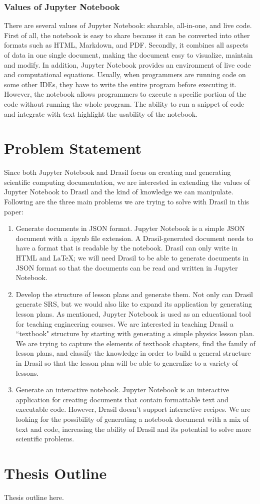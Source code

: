 \subsubsection{Values of Jupyter Notebook}
There are several values of Jupyter Notebook: sharable, all-in-one, and live 
code. First of all, the notebook is easy to share because it can be converted 
into other formats such as HTML, Markdown, and PDF. Secondly, it combines all 
aspects of data in one single document, making the document easy to visualize, 
maintain and modify. In addition, Jupyter Notebook provides an environment of 
live code and computational equations. Usually, when programmers are running 
code on some other IDEs, they have to write the entire program before executing 
it. However, the notebook allows programmers to execute a specific portion of 
the code without running the whole program. The ability to run a snippet of 
code and integrate with text highlight the usability of the notebook.

\section{Problem Statement}
Since both Jupyter Notebook and Drasil focus on creating and generating 
scientific computing documentation, we are interested in extending the values 
of Jupyter Notebook to Drasil and the kind of knowledge we can manipulate. 
Following are the three main problems we are trying to solve with Drasil in 
this paper:

\begin{enumerate}
	\item Generate documents in JSON format. Jupyter Notebook is a simple JSON 
	document with a .ipynb file extension. A Drasil-generated document needs to 
	have a format that is readable by the notebook. Drasil can only write in 
	HTML and LaTeX; we will need Drasil to be able to generate documents in 
	JSON format so that the documents can be read and written in Jupyter 
	Notebook.
	\item Develop the structure of lesson plans and generate them. Not only can 
	Drasil generate SRS, but we would also like to expand its application by 
	generating lesson plans. As mentioned, Jupyter Notebook is used as an 
	educational tool for teaching engineering courses. We are interested in 
	teaching Drasil a ``textbook" structure by starting with generating a 
	simple physics lesson plan. We are trying to capture the elements of 
	textbook chapters, find the family of lesson plans, and classify the 
	knowledge in order to build a general structure in Drasil so that the 
	lesson plan will be able to generalize to a variety of lessons.
	\item Generate an interactive notebook. Jupyter Notebook is an interactive 
	application for creating documents that contain formattable text and 
	executable code. However, Drasil doesn't support interactive recipes. We 
	are looking for the possibility of generating a notebook document with a 
	mix of text and code, increasing the ability of Drasil and its potential to 
	solve more scientific problems.
\end{enumerate}

\section{Thesis Outline}
Thesis outline here.
